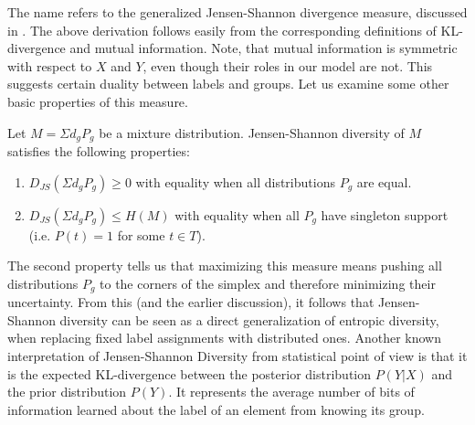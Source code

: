 The name refers to the generalized Jensen-Shannon divergence measure, 
discussed in \cite{FugledeTopsoe}. The above derivation follows easily
from the corresponding definitions of KL-divergence and mutual
information. Note, that mutual information is symmetric with respect
to $X$ and $Y$, even though their roles in our model are not. This
suggests certain duality between labels and groups. Let us examine
some other basic properties of this measure.

\bep\label{jsd-properties}
Let $M=\Sigma d_g P_g$ be a mixture distribution. Jensen-Shannon
diversity of $M$ satisfies the following properties:
 \begin{enumerate}
   \item $D_{JS}(\Sigma d_gP_g)\geq 0$ with equality when all
     distributions $P_g$ are equal.
   \item $D_{JS}(\Sigma d_gP_g)\leq H(M)$ with equality when all
     $P_g$ have singleton support (i.e. $P(t)=1$ for some $t\in T$).
 \end{enumerate}
\eep
The second property tells us that maximizing this measure means
pushing all distributions $P_g$ to the corners of the simplex and
therefore minimizing their uncertainty.
From this (and the earlier discussion), it follows that Jensen-Shannon
diversity can be seen as a direct generalization of entropic
diversity, when replacing fixed label assignments 
with distributed ones. 
Another known interpretation of Jensen-Shannon Diversity from
statistical point of view is that it is the expected KL-divergence
between the posterior distribution $P(Y|X)$ and the prior distribution
$P(Y)$. It represents the average number of bits of information
learned about the label of an element from knowing its group.